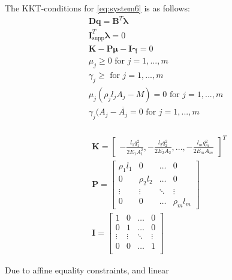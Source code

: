 

The KKT-conditions for \eqref{eq:system6} is as follows:
\begin{equation}
\begin{aligned}
\bm{Dq} = \bm{B}^{T}\bm{\lambda}\\
\bm{I}^{T}_{\textrm{supp}}\bm{\lambda} = 0 \\
\bm{K} - \bm{P}\bm{\mu} - \bm{I}\bm{\gamma} = 0 \\
\mu_j \geq 0  \text{ for } j = 1,...,m \\
\gamma_j \geq \text{ for } j = 1,...,m \\
\mu_j(\rho_{j}l_{j}A_{j}-M) = 0 \text{ for } j = 1,...,m \\
\gamma_{j}(A_{j}-\overline{A_{j}} = 0 \text{ for } j = 1,...,m \\
\end{aligned}
\end{equation}

\begin{align*}
&\bm{K} = \begin{bmatrix}
       -\frac{l_{1}q_{1}^2}{2E_{1}A_{1}^2}
       , -\frac{l_{2}q_{2}^2}{2E_{2}A_{2}}, ...,-\frac{l_{m}q_{m}^2}{2E_{m}A_{m}}
     \end{bmatrix}^T \\
&\bm{P} = \begin{bmatrix}
\rho_{1}l_{1} &  0  & \ldots & 0\\
0  &  \rho_{2}l_{2} & \ldots & 0\\
\vdots & \vdots & \ddots & \vdots\\
0  &   0       &\ldots & \rho_{m}l_{m}
\end{bmatrix}\\
&\bm{I} = \begin{bmatrix}
1 &  0  & \ldots & 0\\
0  &  1 & \ldots & 0\\
\vdots & \vdots & \ddots & \vdots\\
0  &   0  &\ldots & 1 \\
\end{bmatrix}
\end{align*}

Due to affine equality constraints, and linear 